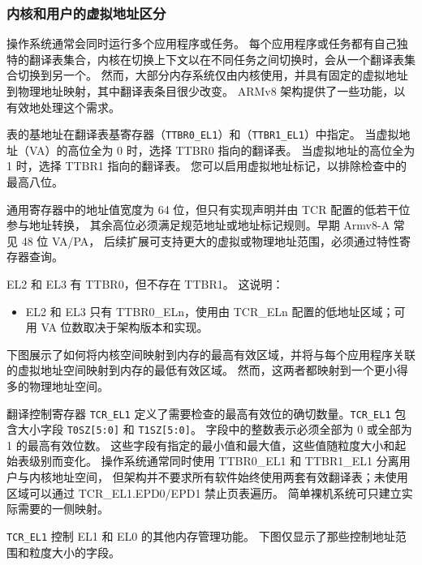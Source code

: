\subsubsection{内核和用户的虚拟地址区分}

操作系统通常会同时运行多个应用程序或任务。
每个应用程序或任务都有自己独特的翻译表集合，内核在切换上下文以在不同任务之间切换时，会从一个翻译表集合切换到另一个。
然而，大部分内存系统仅由内核使用，并具有固定的虚拟地址到物理地址映射，其中翻译表条目很少改变。
ARMv8 架构提供了一些功能，以有效地处理这个需求。

表的基地址在翻译表基寄存器（\lstinline!TTBR0_EL1!）和（\lstinline!TTBR1_EL1!）中指定。
当虚拟地址（VA）的高位全为 0 时，选择 TTBR0 指向的翻译表。
当虚拟地址的高位全为 1 时，选择 TTBR1 指向的翻译表。
您可以启用虚拟地址标记，以排除检查中的最高八位。

通用寄存器中的地址值宽度为 64 位，但只有实现声明并由 TCR 配置的低若干位参与地址转换，
其余高位必须满足规范地址或地址标记规则。早期 Armv8-A 常见 48 位 VA/PA，
后续扩展可支持更大的虚拟或物理地址范围，必须通过特性寄存器查询。

EL2 和 EL3 有 TTBR0，但不存在 TTBR1。
这说明：

\begin{itemize}
  \item EL2 和 EL3 只有 TTBR0\_ELn，使用由 TCR\_ELn 配置的低地址区域；可用 VA 位数取决于架构版本和实现。
\end{itemize}

下图展示了如何将内核空间映射到内存的最高有效区域，并将与每个应用程序关联的虚拟地址空间映射到内存的最低有效区域。
然而，这两者都映射到一个更小得多的物理地址空间。


翻译控制寄存器 \lstinline!TCR_EL1! 定义了需要检查的最高有效位的确切数量。\lstinline!TCR_EL1! 包含大小字段 \lstinline!T0SZ[5:0]! 和 \lstinline!T1SZ[5:0]!。
字段中的整数表示必须全部为 0 或全部为 1 的最高有效位数。
这些字段有指定的最小值和最大值，这些值随粒度大小和起始表级别而变化。
操作系统通常同时使用 TTBR0\_EL1 和 TTBR1\_EL1 分离用户与内核地址空间，
但架构并不要求所有软件始终使用两套有效翻译表；未使用区域可以通过 TCR\_EL1.EPD0/EPD1 禁止页表遍历。
简单裸机系统可只建立实际需要的一侧映射。


\lstinline!TCR_EL1! 控制 EL1 和 EL0 的其他内存管理功能。
下图仅显示了那些控制地址范围和粒度大小的字段。

